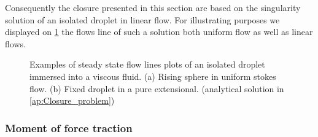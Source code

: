 Consequently the closure presented in this section are based on the singularity solution of an isolated droplet in linear flow. 
For illustrating purposes we displayed on \ref{fig:flowlines} the flows line of such a solution both uniform flow as well as linear flows. 
\begin{figure}[h!]
    \centering
    \caption{Examples of steady state flow lines plots of an isolated droplet immersed into a viscous fluid. 
    (a) Rising sphere in uniform stokes flow. 
    (b) Fixed droplet in a pure extensional.
    (analytical solution in \ref{ap:Closure_problem})}
    \label{fig:flowlines}
\end{figure}

\subsubsection{Moment of force traction}

